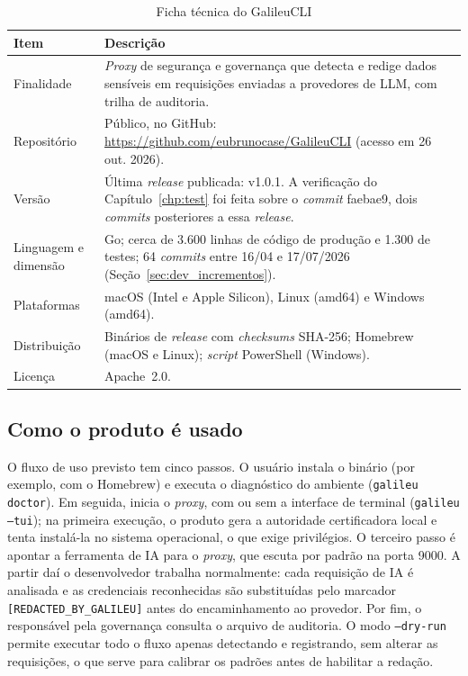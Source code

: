 \begin{table}[htb]
\centering
\caption{Ficha técnica do GalileuCLI}\label{tab:ficha}
\small
\begin{tabular}{|p{3.4cm}|p{11.2cm}|}
\hline
\textbf{Item} & \textbf{Descrição} \\ \hline
Finalidade & \textit{Proxy} de segurança e governança que detecta e redige dados sensíveis em requisições enviadas a provedores de LLM, com trilha de auditoria. \\ \hline
Repositório & Público, no GitHub: \url{https://github.com/eubrunocase/GalileuCLI} (acesso em 26 out. 2026). \\ \hline
Versão & Última \textit{release} publicada: v1.0.1. A verificação do Capítulo~\ref{chp:test} foi feita sobre o \textit{commit} faebae9, dois \textit{commits} posteriores a essa \textit{release}. \\ \hline
Linguagem e dimensão & Go; cerca de 3.600 linhas de código de produção e 1.300 de testes; 64 \textit{commits} entre 16/04 e 17/07/2026 (Seção~\ref{sec:dev_incrementos}). \\ \hline
Plataformas & macOS (Intel e Apple Silicon), Linux (amd64) e Windows (amd64). \\ \hline
Distribuição & Binários de \textit{release} com \textit{checksums} SHA-256; Homebrew (macOS e Linux); \textit{script} PowerShell (Windows). \\ \hline
Licença & Apache~2.0. \\ \hline
\end{tabular}
\end{table}

\subsection{Como o produto é usado}

O fluxo de uso previsto tem cinco passos. O usuário instala o binário (por exemplo, com o Homebrew) e executa o diagnóstico do ambiente (\texttt{galileu doctor}). Em seguida, inicia o \textit{proxy}, com ou sem a interface de terminal (\texttt{galileu --tui}); na primeira execução, o produto gera a autoridade certificadora local e tenta instalá-la no sistema operacional, o que exige privilégios. O terceiro passo é apontar a ferramenta de IA para o \textit{proxy}, que escuta por padrão na porta 9000. A partir daí o desenvolvedor trabalha normalmente: cada requisição de IA é analisada e as credenciais reconhecidas são substituídas pelo marcador \texttt{[REDACTED\_BY\_GALILEU]} antes do encaminhamento ao provedor. Por fim, o responsável pela governança consulta o arquivo de auditoria. O modo \texttt{--dry-run} permite executar todo o fluxo apenas detectando e registrando, sem alterar as requisições, o que serve para calibrar os padrões antes de habilitar a redação.

